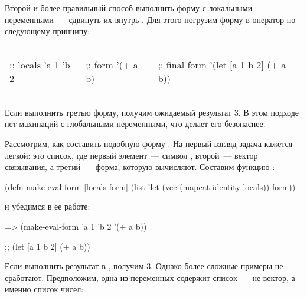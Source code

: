 Второй и более правильный способ выполнить форму с локальными переменными~--- сдвинуть их внутрь . Для этого погрузим форму в оператор  по следующему принципу:

\begin{english}
\noindent
\begin{tabular}{ @{}p{3.5cm} @{}p{3cm} @{}p{3cm} }

  \begin{clojure}
;; locals
{'a 1 'b 2}
  \end{clojure}

&

  \begin{clojure}
;; form
'(+ a b)
  \end{clojure}

&

  \begin{clojure}
;; final form
'(let [a 1 b 2]
   (+ a b))
  \end{clojure}

\end{tabular}
\end{english}

Если выполнить третью форму, получим ожидаемый результат 3. В этом подходе нет махинаций с глобальными переменными, что делает его безопаснее.

Рассмотрим, как составить подобную форму . На первый взгляд задача кажется легкой: это список, где первый элемент~--- символ , второй~--- вектор связывания, а третий~--- форма, которую вычисляют. Составим функцию :

\begin{english}
  \begin{clojure}
(defn make-eval-form
  [locals form]
  (list 'let (vec (mapcat identity locals)) form))
  \end{clojure}
\end{english}

\noindent
и убедимся в ее работе:

\begin{english}
  \begin{clojure}
=> (make-eval-form {'a 1 'b 2} '(+ a b))

;; (let [a 1 b 2] (+ a b))
  \end{clojure}
\end{english}

Если выполнить результат в , получим 3. Однако более сложные примеры не сработают. Предположим, одна из переменных содержит список~--- не вектор, а именно список чисел:

